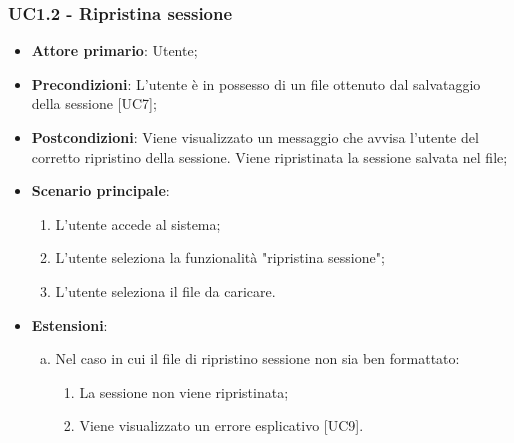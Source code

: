 \subsubsection{UC1.2 - Ripristina sessione}

\begin{itemize}
	\item \textbf{Attore primario}: Utente;
	\item \textbf{Precondizioni}: L'utente è in possesso di un file  ottenuto dal salvataggio della sessione [UC7];
	\item \textbf{Postcondizioni}: Viene visualizzato un messaggio che avvisa l'utente del corretto ripristino della sessione. Viene ripristinata la sessione salvata nel file;
	\item \textbf{Scenario principale}:
		\begin{enumerate}
			\item L'utente accede al sistema;
			\item L'utente seleziona la funzionalità "ripristina sessione";
			\item L'utente seleziona il file da caricare.
		\end{enumerate}
	\item \textbf{Estensioni}:
	\begin{enumerate}[(a)]
		\item Nel caso in cui il file di ripristino sessione non sia ben formattato:
		\begin{enumerate}[1.]
			\item La sessione non viene ripristinata;
			\item Viene visualizzato un errore esplicativo [UC9].
		\end{enumerate}
	\end{enumerate}
\end{itemize}

